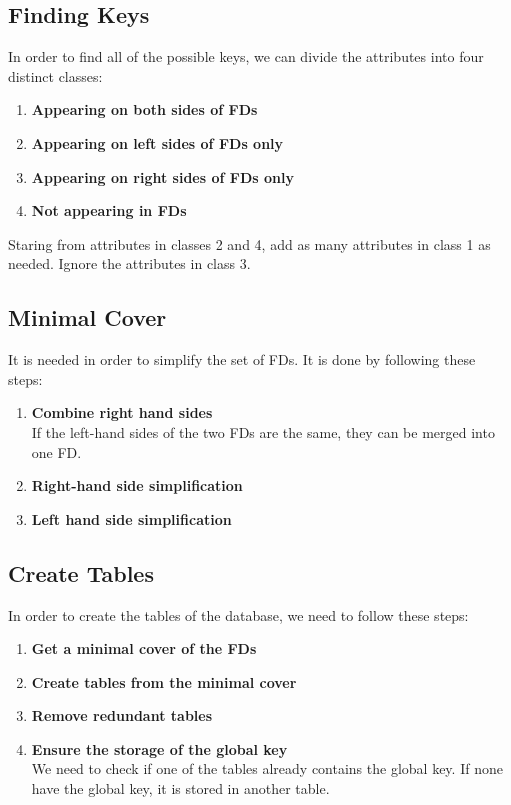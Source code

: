 \documentclass{article}
\begin{document}
\subsection{Finding Keys}
In order to find all of the possible keys, we can divide the attributes into four distinct classes:

\begin{enumerate}
	\item \textbf{Appearing on both sides of FDs}
	\item \textbf{Appearing on left sides of FDs only}
	\item \textbf{Appearing on right sides of FDs only}
	\item \textbf{Not appearing in FDs}
\end{enumerate}
Staring from attributes in classes 2 and 4, add as many attributes in class 1 as needed. Ignore the attributes in class 3.

\subsection{Minimal Cover}
It is needed in order to simplify the set of FDs. It is done by following these steps:

\begin{enumerate}
	\item \textbf{Combine right hand sides}
	\vspace{.2cm} \\
	If the left-hand sides of the two FDs are the same, they can be merged into one FD.
	
	\item \textbf{Right-hand side simplification}
	
	\item \textbf{Left hand side simplification}
\end{enumerate}

\subsection{Create Tables}
In order to create the tables of the database, we need to follow these steps:

\begin{enumerate}
	\item \textbf{Get a minimal cover of the FDs}
	\item \textbf{Create tables from the minimal cover}
	\item \textbf{Remove redundant tables}
	\item \textbf{Ensure the storage of the global key}
	\vspace{.2cm} \\
	We need to check if one of the tables already contains the global key. If none have the global key, it is stored in another table.
\end{enumerate}
\end{document}
